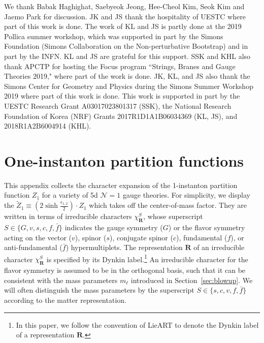 \documentclass[letterpaper, 11pt]{article}
\def\e{\epsilon}
\begin{document}
{\acknowledgments
We thank Babak Haghighat, Saebyeok Jeong, Hee-Cheol Kim, Seok Kim and Jaemo Park for discussion. 
JK and JS thank the hospitality of UESTC where part of this work is done. 
The work of KL and JS is partly done at the 2019 Pollica summer workshop, which was supported in part by the Simons Foundation (Simons Collaboration on the Non-perturbative Bootstrap) and in part by the INFN. KL and JS are grateful for this support.
SSK and KHL also thank APCTP for hosting the Focus program ``Strings, Branes and Gauge Theories 2019," where part of the work is done.
JK, KL, and JS also thank the Simons Center for Geometry and Physics during the Simons Summer Workshop 2019 where part of this work is done. 
This work is supported in part by the UESTC Research Grant A03017023801317 (SSK), the National Research Foundation of Korea (NRF) Grants 2017R1D1A1B06034369 (KL, JS), and 2018R1A2B6004914 (KHL).


\appendix
\section{One-instanton partition functions}
\label{sec:data}

This appendix collects the character expansion of the 1-instanton partition function $Z_1$ for a variety of 5d $\mathcal{N}=1$ gauge theories. For simplicity, we display the $\tilde{Z}_1 \equiv (2\sinh{\frac{\e_{1,2}}{2}}) \cdot Z_1$ which takes off the center-of-mass factor. They are written in terms of irreducible characters $\chi_{\mathbf{R}}^S$, whose superscript $S \in \{G,v,s,c,f,\bar{f}\}$ indicates the gauge symmetry ($G$) or the flavor symmetry acting on the vector ($v$), spinor ($s$), conjugate spinor ($c$), fundamental ($f$), or anti-fundamental ($\bar{f}$) hypermultiplets. The representation $\mathbf{R}$ of an irreducible character $\chi_{\mathbf{R}}^S$ is specified by its Dynkin label.\footnote{In this paper, we follow the convention of  LieART \cite{Feger:2012bs} to denote the Dynkin label of a representation $\mathbf{R}$.} An irreducible character for the flavor symmetry is assumed to be in the orthogonal basis, such that it can be consistent with the mass parameters $m_\ell$ introduced in Section~\ref{sec:blowup}. We will often distinguish the mass parameters by the superscript $S \in \{s,c,v,f,\bar{f}\}$ according to the matter representation. 

}
\end{document}
